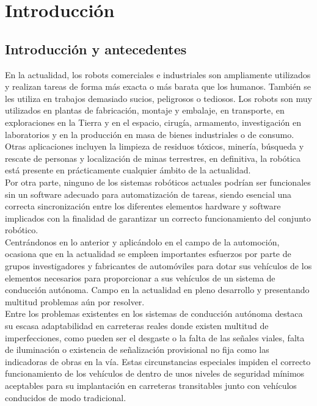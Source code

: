 

\chapter{Introducción}
\label{chap:introducción}

\section{Introducción y antecedentes}

En la actualidad, los robots comerciales e industriales son ampliamente utilizados y realizan tareas de forma más exacta o más barata que los humanos. También se les utiliza en trabajos demasiado sucios, peligrosos o tediosos. Los robots son muy utilizados en plantas de fabricación, montaje y embalaje, en transporte, en exploraciones en la Tierra y en el espacio, cirugía, armamento, investigación en laboratorios y en la producción en masa de bienes industriales o de consumo. Otras aplicaciones incluyen la limpieza de residuos tóxicos, minería, búsqueda y rescate de personas y localización de minas terrestres, en definitiva, la robótica está presente en prácticamente cualquier ámbito de la actualidad.\\

Por otra parte, ninguno de los sistemas robóticos actuales podrían ser funcionales sin un software adecuado para automatización de tareas, siendo esencial una correcta sincronización entre los diferentes elementos hardware y software implicados con la finalidad de garantizar un correcto funcionamiento del conjunto robótico.\\

Centrándonos en lo anterior y aplicándolo en el campo de la automoción, ocasiona que en la actualidad se empleen importantes esfuerzos por parte de grupos investigadores y fabricantes de automóviles para dotar sus vehículos de los elementos necesarios para proporcionar a sus vehículos de un sistema de conducción autónoma. Campo en la actualidad en pleno desarrollo y presentando multitud problemas aún por resolver.\\

Entre los problemas existentes en los sistemas de conducción autónoma destaca su escasa adaptabilidad en carreteras reales donde existen multitud de imperfecciones, como pueden ser el desgaste o la falta de las señales viales, falta de iluminación o existencia de señalización provisional no fija como las indicadoras de obras en la vía. Estas circunstancias especiales impiden el correcto funcionamiento de los vehículos de dentro de unos niveles de seguridad mínimos aceptables para su implantación en carreteras transitables junto con vehículos conducidos de modo tradicional.\\

